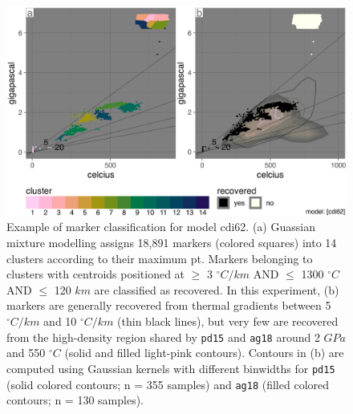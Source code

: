\begin{figure}[htbp]

{\centering \includegraphics[width=1\linewidth,]{assets/figs/chpt4/cdi62_k14_class} 

}

\caption[Example of marker classification for model cdi62]{Example of marker classification for model cdi62. (a) Guassian mixture modelling assigns 18,891 markers (colored squares) into 14 clusters according to their maximum \gls{pt}. Markers belonging to clusters with centroids positioned at \(\geq\) 3 \(^\circ C/km\) AND \(\leq\) 1300 \(^\circ C\) AND \(\leq\) 120 \(km\) are classified as recovered. In this experiment, (b) markers are generally recovered from thermal gradients between 5 \(^\circ C/km\) and 10 \(^\circ C/km\) (thin black lines), but very few are recovered from the high-density region shared by \texttt{pd15} and \texttt{ag18} around 2 \(GPa\) and 550 \(^\circ C\) (solid and filled light-pink contours). Contours in (b) are computed using Gaussian kernels with different binwidths for \texttt{pd15} (solid colored contours; n = 355 samples) and \texttt{ag18} (filled colored contours; n = 130 samples).}\label{fig:class}
\end{figure}



